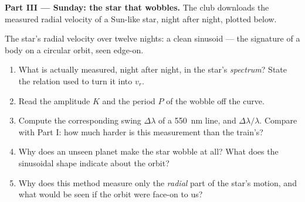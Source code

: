 \begin{problem}
\medskip
\noindent\textbf{Part III --- Sunday: the star that wobbles.}
The club downloads the measured radial velocity of a Sun-like star, night after night,
plotted below.

\begin{omfigure}

{\small The star's radial velocity over twelve nights: a clean sinusoid --- the
signature of a body on a circular orbit, seen edge-on.}
\end{omfigure}

\begin{enumerate}[resume]
  \item What is actually measured, night after night, in the star's \emph{spectrum}? State
        the relation used to turn it into $v_r$.
  \item Read the amplitude $K$ and the period $P$ of the wobble off the curve.
  \item Compute the corresponding swing $\Delta\lambda$ of a \qty{550}{nm} line, and
        $\Delta\lambda/\lambda$. Compare with Part I: how much harder is this measurement
        than the train's?
  \item Why does an unseen planet make the star wobble at all? What does the sinusoidal
        shape indicate about the orbit?
  \item Why does this method measure only the \emph{radial} part of the star's motion, and
        what would be seen if the orbit were face-on to us?
\end{enumerate}


\end{problem}
